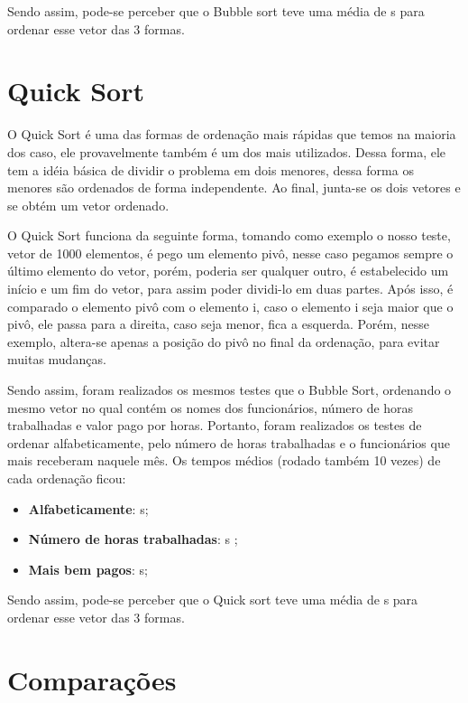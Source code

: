 \documentclass[12pt]{article}
\begin{document}
Sendo assim, pode-se perceber que o Bubble sort teve uma média de \mediaBubble s para ordenar esse vetor das 3 formas.

\section{Quick Sort}

O Quick Sort é uma das formas de ordenação mais rápidas que temos na maioria dos caso, ele provavelmente também é um dos mais utilizados. Dessa forma, ele tem a idéia básica de dividir o problema em dois menores, dessa forma os menores são ordenados de forma independente. Ao final, junta-se os dois vetores e se obtém um vetor ordenado.

O Quick Sort funciona da seguinte forma, tomando como exemplo o nosso teste, vetor de 1000 elementos, é pego um elemento pivô, nesse caso pegamos sempre o último elemento do vetor, porém, poderia ser qualquer outro, é estabelecido um início e um fim do vetor, para assim poder dividi-lo em duas partes. Após isso, é comparado o elemento pivô com o elemento i, caso o elemento i seja maior que o pivô, ele passa para a direita, caso seja menor, fica a esquerda. Porém, nesse exemplo, altera-se apenas a posição do pivô no final da ordenação, para evitar muitas mudanças.

Sendo assim, foram realizados os mesmos testes que o Bubble Sort, ordenando o mesmo vetor no qual contém os nomes dos funcionários, número de horas trabalhadas e valor pago por horas. Portanto, foram realizados os testes de ordenar alfabeticamente, pelo número de horas trabalhadas e o funcionários que mais receberam naquele mês. Os tempos médios (rodado também 10 vezes) de cada ordenação ficou:

\begin{itemize}
  \item \textbf{Alfabeticamente}: \alfaQuick  s;
  \item \textbf{Número de horas trabalhadas}: \horasQuick  s ;
  \item \textbf{Mais bem pagos}: \pagosQuick  s;
\end{itemize}

Sendo assim, pode-se perceber que o Quick sort teve uma média de \mediaQuick s para ordenar esse vetor das 3 formas.

\section{Comparações}
\end{document}
